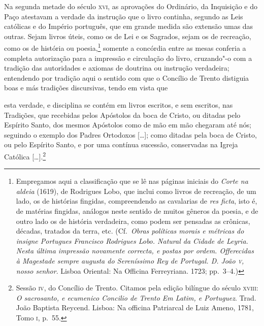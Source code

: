 Na segunda metade do século \textsc{xvi}, as aprovações do Ordinário, da
Inquisição e do Paço atestavam a verdade da instrução que o livro
continha, segundo as Leis católicas e do Império português, que em
grande medida são extensão umas das outras. Sejam livros úteis, como os
de Lei e os Sagrados, sejam os de recreação, como os de história ou
poesia,\footnote{ Empregamos aqui a classificação que se lê nas páginas
iniciais do \textit{Corte na aldeia} (1619), de Rodrigues Lobo, que inclui como
livros de recreação, de um lado, os de histórias fingidas, compreendendo
as cavalarias de \textit{res ficta}, isto é, de matérias fingidas, análogos neste
sentido de muitos gêneros da poesia, e de outro lado os de história
verdadeira, como podem ser pensadas as crônicas, décadas, tratados da
terra, etc. (Cf.~\textit{Obras políticas morais e métricas do insigne Portugues
Francisco Rodrigues Lobo. Natural da Cidade de Leyria. Nesta última
impressão novamente correcta, e postas por ordem. Offerecidas à
Magestade sempre augusta do Sereníssimo Rey de Portugal. D. João \textsc{v},
nosso senhor}. Lisboa Oriental: Na Officina Ferreyriana. 1723;
pp.~3--4.)} somente a concórdia entre as mesas conferia a completa
autorização para a impressão e circulação do livro, cruzando"-o com a
tradição das autoridades e axiomas de doutrina ou instrução verdadeira;
entendendo por tradição aqui o sentido com que o Concílio de Trento
distiguia boas e más tradições discursivas, tendo em vista que 

\begin{hedraquote}
esta verdade, e disciplina se contém em livros escritos, e sem escritos,
nas Tradições, que recebidas pelos Apóstolos da boca de Cristo, ou
ditadas pelo Espírito Santo, dos mesmos Apóstolos como de mão em mão
chegaram até nós; seguindo o exemplo dos Padres Ortodoxos [\ldots{}]; como
ditadas pela boca de Cristo, ou pelo Espírito Santo, e por uma
contínua sucessão, conservadas na Igreja Católica [\ldots{}].\footnote{ Sessão 
\textsc{iv}, do Concílio de Trento. Citamos pela edição bilíngue do
século 	\textsc{xviii}: \textit{O sacrosanto, e ecumenico Concilio de Trento Em Latim, e
Portuguez}. Trad. João Baptista Reycend. Lisboa: Na officina Patriarcal
de Luiz Ameno, 1781, Tomo \textsc{i}, p.~55.}
\end{hedraquote}

